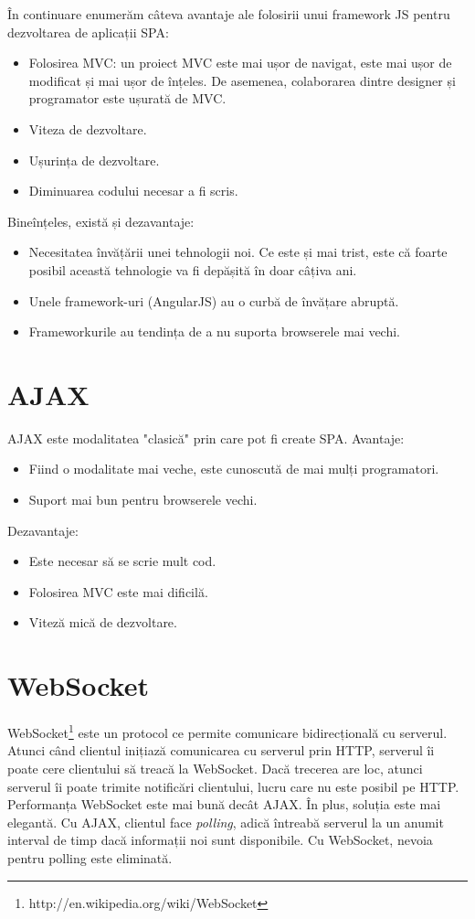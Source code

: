 În continuare enumerăm câteva avantaje ale folosirii unui framework JS pentru
dezvoltarea de aplicații SPA:
\begin{itemize}
  \item Folosirea MVC: un proiect MVC este mai ușor de navigat, este mai ușor
  de modificat și mai ușor de înțeles. De asemenea, colaborarea dintre
  designer și programator este ușurată de MVC.
  \item Viteza de dezvoltare.
  \item Ușurința de dezvoltare.
  \item Diminuarea codului necesar a fi scris.
\end{itemize}

Bineînțeles, există și dezavantaje:
\begin{itemize}
  \item Necesitatea învățării unei tehnologii noi. Ce este și mai trist, este
  că foarte posibil această tehnologie va fi depășită în doar câțiva ani.
  \item Unele framework-uri (AngularJS) au o curbă de învățare abruptă.
  \item Frameworkurile au tendința de a nu suporta browserele mai vechi.
\end{itemize}


\section{AJAX}
AJAX este modalitatea "clasică" prin care pot fi create SPA.
Avantaje:
\begin{itemize}
\item Fiind o modalitate mai veche, este cunoscută de mai mulți programatori.
\item Suport mai bun pentru browserele vechi.
\end{itemize}
Dezavantaje:
\begin{itemize}
\item Este necesar să se scrie mult cod.
\item Folosirea MVC este mai dificilă.
\item Viteză mică de dezvoltare.
\end{itemize}

\section{WebSocket}
WebSocket\footnote{http://en.wikipedia.org/wiki/WebSocket} este un protocol
ce permite comunicare bidirecțională cu serverul. Atunci când clientul
inițiază comunicarea cu serverul prin HTTP, serverul îi poate cere clientului
să treacă la WebSocket. Dacă trecerea are loc, atunci serverul îi poate trimite
notificări clientului, lucru care nu este posibil pe HTTP.
Performanța WebSocket este mai bună decât AJAX. În plus, soluția este mai elegantă.
Cu AJAX, clientul face \emph{polling}, adică întreabă serverul la un anumit interval
de timp dacă informații noi sunt disponibile. Cu WebSocket, nevoia pentru polling
este eliminată.

